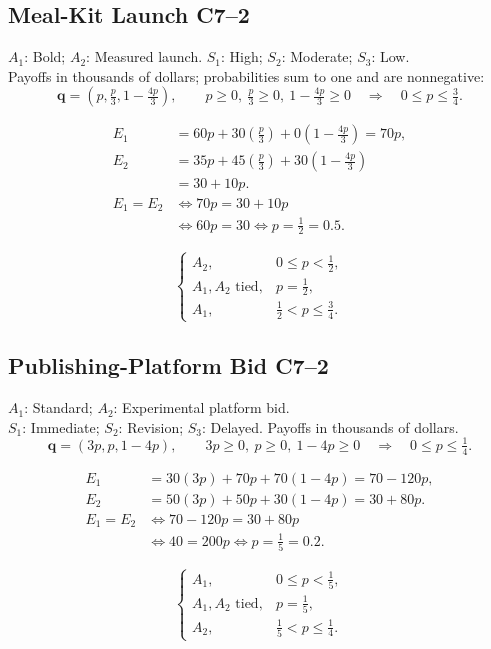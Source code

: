 {	\subsection{Meal-Kit Launch \hfill C7--2}
	$A_1$: Bold; $A_2$: Measured launch. $S_1$: High; $S_2$: Moderate; $S_3$: Low.\\
	Payoffs in thousands of dollars; probabilities sum to one and are nonnegative:
	\[\boldsymbol{q}=\left(p,\tfrac p3,1-\tfrac{4p}{3}\right),\qquad
	p\ge0,\ \tfrac p3\ge0,\ 1-\tfrac{4p}{3}\ge0
	\quad\Longrightarrow\quad 0\le p\le\tfrac34.\]
	\noindent\begin{minipage}[t]{0.55\textwidth}
		\vspace{0pt}
		\begin{align*}
			E_1&=60p+30(\tfrac p3)+0(1-\tfrac{4p}{3})=70p,\\
			E_2&=35p+45(\tfrac p3)+30(1-\tfrac{4p}{3})\\
			&=30+10p.\\[2pt]
			E_1=E_2&\iff70p=30+10p\\
			&\iff60p=30\iff p=\tfrac12=0.5.
		\end{align*}
	\end{minipage}\hfill
	\begin{minipage}[t]{0.42\textwidth}
		\vspace{0pt}
		\[\boxed{\begin{cases}
			A_2,&0\le p<\tfrac12,\\
			A_1,A_2\text{ tied},&p=\tfrac12,\\
			A_1,&\tfrac12<p\le\tfrac34.
		\end{cases}}\]
	\end{minipage}

	\subsection{Publishing-Platform Bid \hfill C7--2}
	$A_1$: Standard; $A_2$: Experimental platform bid.\\
	$S_1$: Immediate; $S_2$: Revision; $S_3$: Delayed. Payoffs in thousands of dollars.
	\[\boldsymbol{q}=(3p,p,1-4p),\qquad 3p\ge0,\ p\ge0,\ 1-4p\ge0
	\quad\Longrightarrow\quad 0\le p\le\tfrac14.\]
	\noindent\begin{minipage}[t]{0.55\textwidth}
		\vspace{0pt}
		\begin{align*}
			E_1&=30(3p)+70p+70(1-4p)=70-120p,\\
			E_2&=50(3p)+50p+30(1-4p)=30+80p.\\[2pt]
			E_1=E_2&\iff70-120p=30+80p\\
			&\iff40=200p\iff p=\tfrac15=0.2.
		\end{align*}
	\end{minipage}\hfill
	\begin{minipage}[t]{0.42\textwidth}
		\vspace{0pt}
		\[\boxed{\begin{cases}
			A_1,&0\le p<\tfrac15,\\
			A_1,A_2\text{ tied},&p=\tfrac15,\\
			A_2,&\tfrac15<p\le\tfrac14.
		\end{cases}}\]
	\end{minipage}
	}


